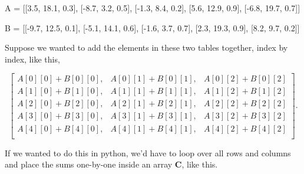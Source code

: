 \documentclass[
  letterpaper,
  DIV=11,
  numbers=noendperiod]{scrreprt}
\newenvironment{Shaded}{\begin{snugshade}}{\end{snugshade}}
\newcommand{\FloatTok}[1]{\textcolor[rgb]{0.68,0.00,0.00}{#1}}
\newcommand{\NormalTok}[1]{\textcolor[rgb]{0.00,0.23,0.31}{#1}}
\newcommand{\OperatorTok}[1]{\textcolor[rgb]{0.37,0.37,0.37}{#1}}
\begin{document}
\begin{Shaded}
\begin{Highlighting}[]
\NormalTok{A }\OperatorTok{=}\NormalTok{ [[}\FloatTok{3.5}\NormalTok{, }\FloatTok{18.1}\NormalTok{, }\FloatTok{0.3}\NormalTok{],}
\NormalTok{     [}\OperatorTok{{-}}\FloatTok{8.7}\NormalTok{, }\FloatTok{3.2}\NormalTok{, }\FloatTok{0.5}\NormalTok{],}
\NormalTok{     [}\OperatorTok{{-}}\FloatTok{1.3}\NormalTok{, }\FloatTok{8.4}\NormalTok{, }\FloatTok{0.2}\NormalTok{],}
\NormalTok{     [}\FloatTok{5.6}\NormalTok{, }\FloatTok{12.9}\NormalTok{, }\FloatTok{0.9}\NormalTok{],}
\NormalTok{     [}\OperatorTok{{-}}\FloatTok{6.8}\NormalTok{, }\FloatTok{19.7}\NormalTok{, }\FloatTok{0.7}\NormalTok{]]}

\NormalTok{B }\OperatorTok{=}\NormalTok{ [[}\OperatorTok{{-}}\FloatTok{9.7}\NormalTok{, }\FloatTok{12.5}\NormalTok{, }\FloatTok{0.1}\NormalTok{],}
\NormalTok{     [}\OperatorTok{{-}}\FloatTok{5.1}\NormalTok{, }\FloatTok{14.1}\NormalTok{, }\FloatTok{0.6}\NormalTok{],}
\NormalTok{     [}\OperatorTok{{-}}\FloatTok{1.6}\NormalTok{, }\FloatTok{3.7}\NormalTok{, }\FloatTok{0.7}\NormalTok{],}
\NormalTok{     [}\FloatTok{2.3}\NormalTok{, }\FloatTok{19.3}\NormalTok{, }\FloatTok{0.9}\NormalTok{],}
\NormalTok{     [}\FloatTok{8.2}\NormalTok{, }\FloatTok{9.7}\NormalTok{, }\FloatTok{0.2}\NormalTok{]]}
\end{Highlighting}
\end{Shaded}

Suppose we wanted to add the elements in these two tables together,
index by index, like this,

\[
\begin{bmatrix}
A[0][0] + B[0][0], & A[0][1] + B[0][1], & A[0][2] + B[0][2] \\
A[1][0] + B[1][0], & A[1][1] + B[1][1], & A[1][2] + B[1][2] \\
A[2][0] + B[2][0], & A[2][1] + B[2][1], & A[2][2] + B[2][2] \\
A[3][0] + B[3][0], & A[3][1] + B[3][1], & A[3][2] + B[3][2] \\
A[4][0] + B[4][0], & A[4][1] + B[4][1], & A[4][2] + B[4][2] \\
\end{bmatrix}.
\]

If we wanted to do this in python, we'd have to loop over all rows and
columns and place the sums one-by-one inside an array \(\mathbf{C}\),
like this.
\end{document}
